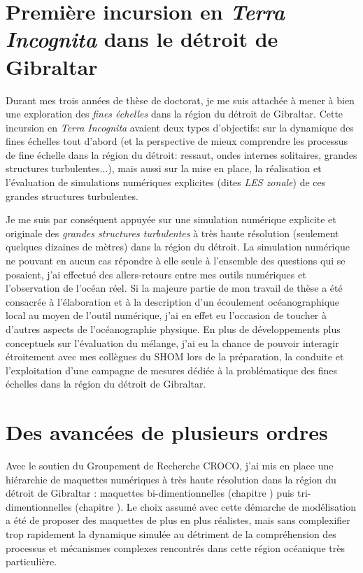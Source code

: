 

\section{Première incursion en \textit{Terra Incognita} dans le détroit de Gibraltar}
Durant mes trois années de thèse de doctorat, je me suis attachée à mener à bien une exploration des \textit{fines échelles} dans la région du détroit de Gibraltar. Cette incursion en \textit{Terra Incognita} avaient deux types d'objectifs: sur la dynamique des fines échelles tout d'abord (et la perspective de mieux comprendre les processus de fine échelle dans la région du détroit: ressaut, ondes internes solitaires, grandes structures turbulentes...), mais aussi sur la mise en place, la réalisation et l'évaluation de simulations numériques explicites (dites \textit{LES zonale}) de ces grandes structures turbulentes.

Je me suis par conséquent appuyée sur une simulation numérique explicite et originale des \textit{grandes structures turbulentes} à très haute résolution (seulement quelques dizaines de mètres) dans la région du détroit. La simulation numérique ne pouvant en aucun cas répondre à elle seule à l'ensemble des questions qui se posaient, j'ai effectué des allers-retours entre mes outils numériques et l'observation de l'océan réel. Si la majeure partie de mon travail de thèse a été consacrée à l'élaboration et à la description d'un écoulement océanographique local au moyen de l'outil numérique, j'ai en effet eu l'occasion de toucher à d'autres aspects de l'océanographie physique.
En plus de développements plus conceptuels sur l'évaluation du mélange,  j'ai eu la chance de pouvoir interagir étroitement avec mes collègues du SHOM lors de la préparation, la conduite et l'exploitation d'une campagne de mesures dédiée à la problématique des fines échelles dans la région du détroit de Gibraltar.

\section{Des avancées de plusieurs ordres}
Avec le soutien du Groupement de Recherche CROCO, j'ai mis en place une hiérarchie de maquettes numériques à très haute résolution dans la région du détroit de Gibraltar : maquettes bi-dimentionnelles (chapitre ) puis tri-dimentionnelles (chapitre ). Le choix assumé avec cette démarche de modélisation a été de proposer des maquettes de plus en plus réalistes, mais sans complexifier trop rapidement la dynamique simulée au détriment de la compréhension des processus et mécanismes complexes rencontrés dans cette région océanique très particulière. 

